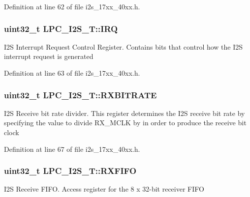 Definition at line 62 of file i2s\+\_\+17xx\+\_\+40xx.\+h.

\subsubsection[{\texorpdfstring{I\+RQ}{IRQ}}]{ uint32\+\_\+t L\+P\+C\+\_\+\+I2\+S\+\_\+\+T\+::\+I\+RQ}\hypertarget{structLPC__I2S__T_a0ed73323cb1c577293f1416c6c55c47f}{}\label{structLPC__I2S__T_a0ed73323cb1c577293f1416c6c55c47f}
I2S Interrupt Request Control Register. Contains bits that control how the I2S interrupt request is generated 

Definition at line 63 of file i2s\+\_\+17xx\+\_\+40xx.\+h.

\subsubsection[{\texorpdfstring{R\+X\+B\+I\+T\+R\+A\+TE}{RXBITRATE}}]{ uint32\+\_\+t L\+P\+C\+\_\+\+I2\+S\+\_\+\+T\+::\+R\+X\+B\+I\+T\+R\+A\+TE}\hypertarget{structLPC__I2S__T_a3f0c2587313eb723ac48ad06af157df9}{}\label{structLPC__I2S__T_a3f0c2587313eb723ac48ad06af157df9}
I2S Receive bit rate divider. This register determines the I2S receive bit rate by specifying the value to divide R\+X\+\_\+\+M\+C\+LK by in order to produce the receive bit clock 

Definition at line 67 of file i2s\+\_\+17xx\+\_\+40xx.\+h.

\subsubsection[{\texorpdfstring{R\+X\+F\+I\+FO}{RXFIFO}}]{ uint32\+\_\+t L\+P\+C\+\_\+\+I2\+S\+\_\+\+T\+::\+R\+X\+F\+I\+FO}\hypertarget{structLPC__I2S__T_aac5c44248c1354eb4320eb5fa5b18baa}{}\label{structLPC__I2S__T_aac5c44248c1354eb4320eb5fa5b18baa}
I2S Receive F\+I\+FO. Access register for the 8 x 32-\/bit receiver F\+I\+FO 

